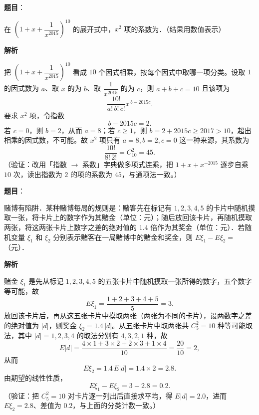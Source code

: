 \begin{answer}

\textbf{题目}：

在 \(\left(1+x+\dfrac{1}{x^{2015}}\right)^{10}\) 的展开式中，\(x^{2}\) 项的系数为\gkblank{}．（结果用数值表示）

\textbf{解析}

把 \(\left(1+x+\dfrac{1}{x^{2015}}\right)^{10}\) 看成 \(10\) 个因式相乘，按每个因式中取哪一项分类。设取 \(1\) 的因式数为 \(a\)、取 \(x\) 的为 \(b\)、取 \(\dfrac{1}{x^{2015}}\) 的为 \(c\)，则 \(a+b+c=10\) 且该项为
\nopagebreak[4]
\[
\frac{10!}{a!\,b!\,c!}x^{\,b-2015c}.
\]
要求 \(x^{2}\) 项，令指数
\nopagebreak[4]
\[
b-2015c=2.
\]
若 \(c=0\)，则 \(b=2\)，从而 \(a=8\)；若 \(c\geqslant1\)，则 \(b=2+2015c\geqslant2017>10\)，超出相乘的因式数，不可能。故 \(x^{2}\) 项只有 \(a=8,b=2,c=0\) 这一种来源，其系数为
\nopagebreak[4]
\[
\frac{10!}{8!\,2!}=C_{10}^{2}=45.
\]
（验证：改用「指数 \(\to\) 系数」字典做多项式连乘，把 \(1+x+x^{-2015}\) 逐步自乘 \(10\) 次，读出指数为 \(2\) 的项的系数为 \(45\)，与通项法一致。）


\end{answer}
\begin{answer}

\textbf{题目}：

赌博有陷阱．某种赌博每局的规则是：赌客先在标记有 \(1,2,3,4,5\) 的卡片中随机摸取一张，将卡片上的数字作为其赌金（单位：元）；随后放回该卡片，再随机摸取两张，将这两张卡片上数字之差的绝对值的 \(1.4\) 倍作为其奖金（单位：元）．若随机变量 \(\xi_{1}\) 和 \(\xi_{2}\) 分别表示赌客在一局赌博中的赌金和奖金，则 \(E\xi_{1}-E\xi_{2}=\)\gkblank{}（元）．

\textbf{解析}

赌金 \(\xi_{1}\) 是先从标记 \(1,2,3,4,5\) 的五张卡片中随机摸取一张所得的数字，五个数字等可能，故
\nopagebreak[4]
\[
E\xi_{1}=\frac{1+2+3+4+5}{5}=3.
\]
放回该卡片后，再从这五张卡片中摸取两张（两张为不同的卡片），设两数字之差的绝对值为 \(|d|\)，则奖金 \(\xi_{2}=1.4\,|d|\)。从五张卡片中取两张共 \(C_{5}^{2}=10\) 种等可能取法，其中 \(|d|=1,2,3,4\) 的取法分别有 \(4,3,2,1\) 种，故
\nopagebreak[4]
\[
E|d|=\frac{4\times1+3\times2+2\times3+1\times4}{10}=\frac{20}{10}=2,
\]
从而
\nopagebreak[4]
\[
E\xi_{2}=1.4\,E|d|=1.4\times2=2.8.
\]
由期望的线性性质，
\nopagebreak[4]
\[
E\xi_{1}-E\xi_{2}=3-2.8=0.2.
\]
（验证：把 \(C_{5}^{2}=10\) 对卡片逐一列出后直接求平均，得 \(E|d|=2.0\)，进而 \(E\xi_{2}=2.8\)、差值为 \(0.2\)，与上面的分类计数一致。）


\end{answer}
